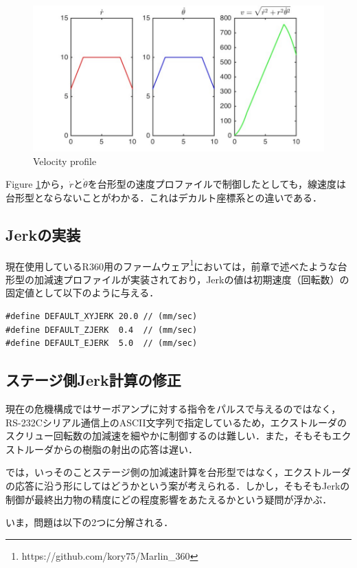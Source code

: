 \documentclass[twocolumn,oneside,a4paper]{article}
\begin{document}
\begin{figure}[htbp]
    \includegraphics[bb=0 0 432 216,width=1\columnwidth]{accel2.pdf}
    \caption{Velocity profile}
    \label{fig:jerk}
\end{figure}

Figure \ref{fig:jerk}から，$\dot{r}$と$\dot{\theta}$を台形型の速度プロファイルで制御したとしても，線速度は台形型とならないことがわかる．これはデカルト座標系との違いである．

\subsection{Jerkの実装}
現在使用しているR360用のファームウェア\footnote{https://github.com/kory75/Marlin\_360}においては，前章で述べたような台形型の加減速プロファイルが実装されており，Jerkの値は初期速度（回転数）の固定値として以下のように与える．
{\small
\begin{verbatim}
#define DEFAULT_XYJERK 20.0 // (mm/sec)
#define DEFAULT_ZJERK  0.4  // (mm/sec)
#define DEFAULT_EJERK  5.0  // (mm/sec)
\end{verbatim}}

\subsection{ステージ側Jerk計算の修正}
現在の危機構成ではサーボアンプに対する指令をパルスで与えるのではなく，RS-232Cシリアル通信上のASCII文字列で指定しているため，エクストルーダのスクリュー回転数の加減速を細やかに制御するのは難しい．また，そもそもエクストルーダからの樹脂の射出の応答は遅い．

では，いっそのことステージ側の加減速計算を台形型ではなく，エクストルーダの応答に沿う形にしてはどうかという案が考えられる．しかし，そもそもJerkの制御が最終出力物の精度にどの程度影響をあたえるかという疑問が浮かぶ．

いま，問題は以下の2つに分解される．
\end{document}
